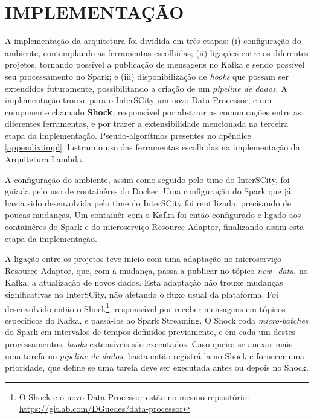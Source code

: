 \section{IMPLEMENTAÇÃO}

A implementação da arquitetura foi dividida em três etapas: (i)
configuração do ambiente, contemplando as ferramentas escolhidas; (ii)
ligações entre os diferentes projetos, tornando possível a publicação de
mensagens no Kafka e sendo possível seu processamento no Spark; e (iii)
disponibilização de \textit{hooks} que possam ser extendidos futuramente,
possibilitando a criação de um \textit{pipeline de dados}. A implementação
trouxe para o InterSCity um novo Data Processor, e um componente chamado
\textbf{Shock}, responsável por abstrair as comunicações entre as diferentes
ferramentas, e por trazer a extensibilidade mencionada na terceira etapa da
implementação. Pseudo-algorítmos presentes no apêndice \ref{appendix:impl}
ilustram o uso das ferramentas escolhidas na implementação da Arquitetura
Lambda.

A configuração do ambiente, assim como seguido pelo time do InterSCity, foi
guiada pelo uso de containêres do Docker. Uma configuração do Spark
que já havia sido desenvolvida pelo time do InterSCity foi reutilizada,
precisando de poucas mudanças. Um containêr com o Kafka foi então configurado e
ligado aos containêres do Spark e do microserviço Resource Adaptor, finalizando
assim esta etapa da implementação.

A ligação entre os projetos teve início com uma adaptação no microserviço
Resource Adaptor, que, com a mudança, passa a publicar no tópico
\textit{new\_data}, no Kafka, a atualização de novos dados. Esta
adaptação não trouxe mudanças significativas no InterSCity, não afetando o
fluxo usual da plataforma. Foi desenvolvido então o Shock\footnote{O Shock e o
novo Data Processor estão no mesmo repositório: \url{https://gitlab.com/DGuedes/data-processor}
}, responsável por
receber mensagens em tópicos específicos do Kafka, e passá-los ao Spark
Streaming. O Shock roda \textit{micro-batches} do Spark em intervalos de tempos
definidos previamente, e em cada um destes processamentos, \textit{hooks}
extensíveis são executados. Caso queira-se anexar mais uma tarefa no
\textit{pipeline de dados}, basta então registrá-la no Shock e fornecer uma
prioridade, que define se uma tarefa deve ser executada antes ou depois no
Shock.
